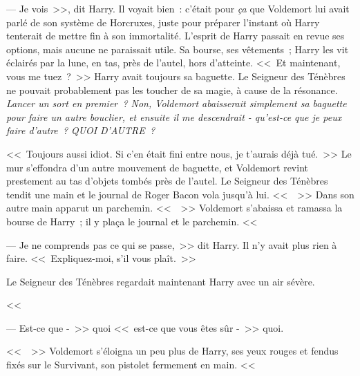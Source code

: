 --- Je vois~>>, dit Harry. Il voyait bien~: c'était pour \emph{ça} que Voldemort lui avait parlé de son système de Horcruxes, juste pour préparer l'instant où Harry tenterait de mettre fin à son immortalité. L'esprit de Harry passait en revue ses options, mais aucune ne paraissait utile. Sa bourse, ses vêtements~; Harry les vit éclairés par la lune, en tas, près de l'autel, hors d'atteinte. <<~Et maintenant, vous me tuez~?~>> Harry avait toujours sa baguette. Le Seigneur des Ténèbres ne pouvait probablement pas les toucher de sa magie, à cause de la résonance. \emph{Lancer un sort en premier~? Non, Voldemort abaisserait simplement sa baguette pour faire un autre bouclier, et ensuite il me descendrait - qu'est-ce que je peux faire d'autre~? QUOI D'AUTRE~?}

<<~Toujours aussi idiot. Si c'en était fini entre nous, je t'aurais déjà tué.~>> Le mur s'effondra d'un autre mouvement de baguette, et Voldemort revint prestement au tas d'objets tombés près de l'autel. Le Seigneur des Ténèbres tendit une main et le journal de Roger Bacon vola jusqu'à lui. <<~~>> Dans son autre main apparut un parchemin. <<~~>> Voldemort s'abaissa et ramassa la bourse de Harry~; il y plaça le journal et le parchemin. <<~

--- Je ne comprends pas ce qui se passe,~>> dit Harry. Il n'y avait plus rien à faire. <<~Expliquez-moi, s'il vous plaît.~>>

Le Seigneur des Ténèbres regardait maintenant Harry avec un air sévère.

<<~

--- Est-ce que -~>> quoi <<~est-ce que vous êtes sûr -~>> quoi.

<<~~>> Voldemort s'éloigna un peu plus de Harry, ses yeux rouges et fendus fixés sur le Survivant, son pistolet fermement en main. <<~

